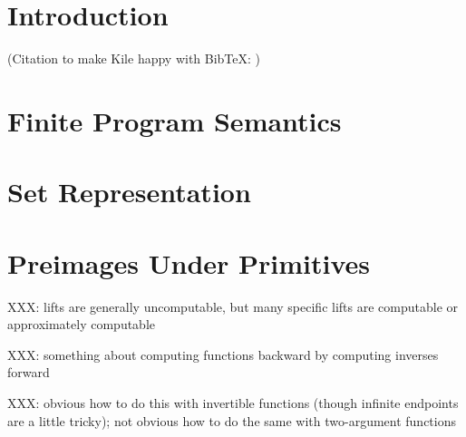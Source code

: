 \documentclass[preprint]{sigplanconf}
\begin{document}
\section{Introduction}

(Citation to make Kile happy with BibTeX: \cite{cit:sergey-2013pldi-monadic-abstract})

\section{Finite Program Semantics}

\section{Set Representation}


\section{Preimages Under Primitives}

\newcommand{\cl}[1]{\overline{\vphantom{i}{#1}}}
\newcommand{\sub}[1]{_{_{#1}}}

XXX: lifts are generally uncomputable, but many specific lifts are computable or approximately computable

XXX: something about computing functions backward by computing inverses forward

XXX: obvious how to do this with invertible functions (though infinite endpoints are a little tricky); not obvious how to do the same with two-argument functions

\begin{comment}
Math facts:

Every totally ordered space is Tychonoff: completely regular and Hausdorff (aka T2)
T2 spaces are T1

T1 spaces:
Limit point compactness is equivalent to countable compactness
Singletons are closed sets

T2 spaces:
Every sequence has a unique limit
Compact sets are closed
Every pair of compact sets can be separated by neighborhoods
Continuous functions into T2 spaces are determined by their values on dense subsets

Tychonoff spaces:
Subpaces of Tychonoff spaces are Tychonoff
Products of Tychonoff spaces are Tychonoff

There are no M-point compactifications for R^N, N > 1, M > 1



\end{comment}
\end{document}
